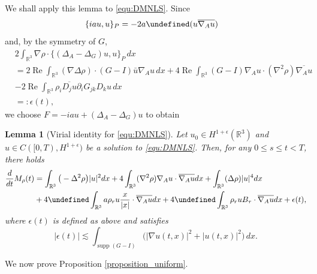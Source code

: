 \documentclass[10pt%
]{amsart}
\numberwithin{equation}{section}
\newcommand{\pa}{\partial}
\let\Im=\undefined\DeclareMathOperator*{\Im}{Im}
\newcommand{\R}{\mathbb{R}}
\newtheorem{lemma}[theorem]{Lemma}
\theoremstyle{definition}
\begin{document}
We shall apply this lemma to \eqref{equ:DMNLS}. Since
\begin{align*}
	\{iau,u\}_P&=-2a\Im (u\overline{\nabla_Au})
\end{align*}
and, by the symmetry of $G$, 
\begin{align}\label{equ:errtermMore}	
	&2\int_{\R^3}\nabla\rho\cdot\{(\Delta_A-\Delta_G)u,u\}_P\,dx\\\nonumber
	&=2\mathop{\mathrm{Re}} \int_{\R^3}(\nabla\Delta\rho)\cdot(G-I)\bar{u}\nabla_Au\,dx+4\mathop{\mathrm{Re}} \int_{\R^3}(G-I)\nabla_Au\cdot(\nabla^2\rho)\overline{\nabla_Au}\\\nonumber
	&-2\mathop{\mathrm{Re}} \int_{\R^3}\rho_i\overline{D_ju}\pa_iG_{jk}D_ku\,dx\\\nonumber
	&=: \epsilon(t), 
\end{align}
we choose $F=-iau+(\Delta_A-\Delta_G)u$ to obtain

\begin{lemma}[Virial identity for \eqref{equ:DMNLS}]\label{lem:Moraw}
	Let $u_0\in H^{1+\epsilon}(\R^3)$ and $u\in C([0,T), H^{1+\epsilon})$ be a solution to \eqref{equ:DMNLS}. Then, for any $0\leq s\leq t<T$, there holds
	\begin{align*}\nonumber
		\frac{d}{dt}M_\rho(t)&=\int_{\R^3}\big(-\Delta^2\rho\big)|u|^2dx+4\int_{\R^3}(\nabla^2\rho) \nabla_A u\cdot \overline{\nabla_A u}dx+\int_{\R^3}(\Delta \rho)|u|^{4}dx\\
		&+
		4\Im \int_{\R^3}a\rho_ru\frac{x}{|x|}\cdot\overline{\nabla_A u}dx
		+4\Im \int_{\R^3}\rho_ruB_\tau \cdot \overline{\nabla_A u}dx
		+ \epsilon(t),
	\end{align*}
	where $\epsilon(t)$ is defined as above and satisfies
	$$| \epsilon(t)|\lesssim \int_{ \mathop{\mathrm{supp}} (G-I)}\big(|\nabla u(t,x)|^2+|u(t,x)|^2\big)\,dx.$$
	
\end{lemma}
%




We now prove Proposition \ref{proposition_uniform}.
\end{document}
